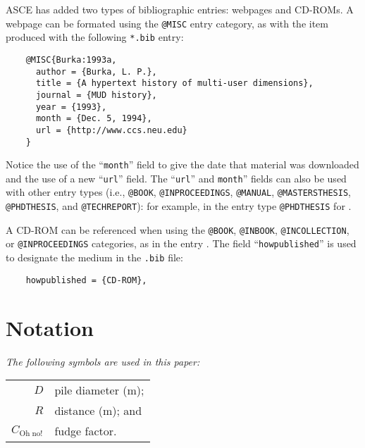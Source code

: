 \documentclass[Journal,letterpaper]{ascelike-new}
\begin{document}
%
\par
ASCE has added two types of bibliographic entries:
webpages and CD-ROMs.  A webpage can be formated using the
\texttt{@MISC} entry category, as with the item \cite{Burka:1993a} produced
with the following \texttt{*.bib} entry:
\begin{verbatim}
    @MISC{Burka:1993a,
      author = {Burka, L. P.},
      title = {A hypertext history of multi-user dimensions},
      journal = {MUD history},
      year = {1993},
      month = {Dec. 5, 1994},
      url = {http://www.ccs.neu.edu}
    }
\end{verbatim}
Notice the use of the ``\texttt{month}'' field to give the date that material
was downloaded and the use of a new ``\texttt{url}'' field.
The ``\texttt{url}'' and \texttt{month}''
fields can also be used with other entry types
(i.e., \texttt{@BOOK}, \texttt{@INPROCEEDINGS}, \texttt{@MANUAL},
\texttt{@MASTERSTHESIS}, \texttt{@PHDTHESIS}, and \texttt{@TECHREPORT}):
for example, in the entry type \texttt{@PHDTHESIS} for \cite{Wichtmann:2005a}.
%
\par
A CD-ROM can be referenced when using the \texttt{@BOOK}, \texttt{@INBOOK},
\texttt{@INCOLLECTION}, or \texttt{@INPROCEEDINGS} categories,
as in the entry \cite{Liggett:1998a}.
The field ``\texttt{howpublished}'' is used to designate the medium
in the \texttt{.bib} file:
\begin{verbatim}
    howpublished = {CD-ROM},
\end{verbatim}
%
\pagebreak
%
\appendix
%
%
\section{Notation}
\label{app:notation}
\emph{The following symbols are used in this paper:}%
\nopagebreak
\par
\begin{tabular}{r  @{\hspace{1em}=\hspace{1em}}  l}
      $D$                    & pile diameter (m);     \\
      $R$                    & distance (m);      and \\
      $C_{\mathrm{Oh\;no!}}$ & fudge factor.
\end{tabular}
\end{document}
